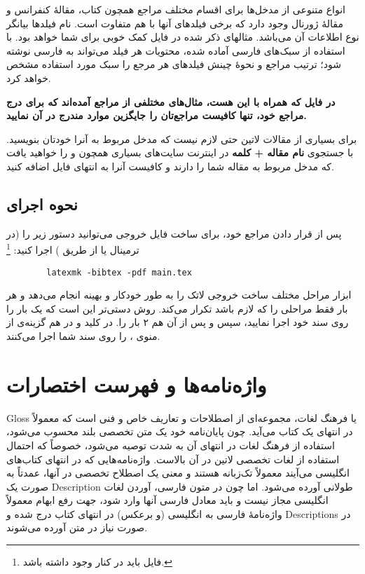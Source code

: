 انواع متنوعی از مدخل‌ها برای اقسام مختلف مراجع همچون کتاب، مقالهٔ کنفرانس و مقالهٔ ژورنال وجود دارد که برخی فیلدهای آنها با هم متفاوت است. 
نام فیلدها بیانگر نوع اطلاعات آن می‌باشد. مثالهای ذکر شده در فایل  کمک خوبی برای شما خواهد بود. 
با استفاده از سبک‌های فارسی آماده شده، محتویات هر فیلد می‌تواند به فارسی نوشته شود؛ ترتیب مراجع و نحوهٔ چینش فیلدهای هر مرجع را سبک مورد استفاده  مشخص خواهد کرد.

\textbf{در فایل 
 که همراه با این \پ هست، مثال‌های مختلفی از مراجع آمده‌اند که برای درج مراجع خود، تنها کافیست مراجع‌تان را جایگزین موارد مندرج در آن نمایید.
}

برای بسیاری از مقالات لاتین حتی لازم نیست که مدخل مربوط به آنرا خودتان بنویسید. با جستجوی 
\textbf{نام مقاله + کلمه
}
در اینترنت سایت‌های بسیاری همچون
 و 
را خواهید یافت که مدخل
مربوط به مقاله شما را دارند و کافیست آنرا به انتهای فایل
اضافه کنید.

\subsection{نحوه اجرای \texorpdfstring{}{Bib\TeX}}
پس از قرار دادن مراجع خود، برای ساخت فایل خروجی می‌توانید دستور زیر را (در ترمینال یا از طریق ) اجرا کنید:%
\footnote{فایل  باید در کنار  وجود داشته باشد.}

\singlespacing
\begin{LTR}
	\begin{verbatim}
		latexmk -bibtex -pdf main.tex
	\end{verbatim}
\end{LTR}
\doublespacing
ابزار  مراحل مختلف ساخت خروجی لاتک را به طور خودکار و بهینه انجام می‌دهد و هر بار فقط مراحلی را که لازم باشد تکرار می‌کند.
روش دستی‌تر این است که یک بار  را روی سند خود اجرا نمایید، سپس  و پس از آن هم ۲ بار  را. در  کلید  و در  هم گزینه‌ی  از منوی ،  را روی سند شما اجرا می‌کنند.

\section{واژه‌نامه‌ها و فهرست اختصارات}
\gls{Gloss}
یا فرهنگ لغات، مجموعه‌ای از اصطلاحات و تعاریف خاص و فنی است که معمولاً در انتهای یک کتاب می‌آید. چون پایان‌نامه خود یک متن تخصصی بلند محسوب می‌شود، استفاده از فرهنگ لغات در انتهای آن به شدت توصیه می‌شود، خصوصاً که احتمال استفاده از لغات تخصصی لاتین در آن بالاست.
واژه‌نامه‌هایی که در انتهای کتاب‌های انگلیسی می‌آیند معمولاً تک‌زبانه هستند و معنی یک اصطلاح تخصصی در آنها، عمدتاً به صورت یک
\gls{Description}
طولانی آورده می‌شود. اما چون در متون فارسی، آوردن لغات انگلیسی مجاز نیست و باید معادل فارسی آنها وارد شود، جهت رفع ابهام معمولاً واژه‌نامهٔ فارسی به انگلیسی (و برعکس) در انتهای کتاب درج شده و  
\glspl{Description}
در صورت نیاز در متن آورده می‌شوند.

